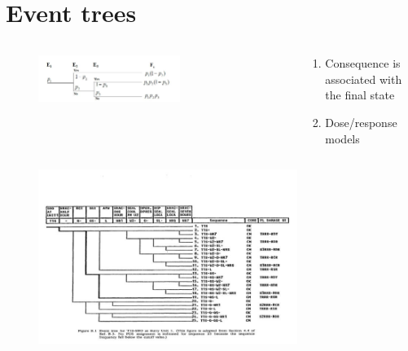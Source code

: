 \documentclass[aspectratio=1610,pdftex,dvipsnames,compress,xcolor={dvipsnames}]{beamer}
\begin{document}
\section{Event trees}


\addtocounter{framenumber}{-1}
\begin{frame}{}
    \begin{columns}[c]

        \begin{column}{0.65\textwidth}
            \begin{figure}
                \centering
                \includegraphics[width=0.65\textwidth]{event.tree.jpg}
            \end{figure}
        \end{column}

        \begin{column}{0.35\textwidth}
            \begin{enumerate}[series=outerlist,topsep=0pt,itemsep=21pt,leftmargin=*,label=(\arabic*)]
                \item[]Consequence is associated with the final state
                \item[]Dose/response models
            \end{enumerate}
        \end{column}

    \end{columns}
\end{frame}


\begin{frame}{}
    \begin{figure}
        \centering
        \includegraphics[width=0.75\textwidth]{event.tree.wash.jpg}
    \end{figure}
\end{frame}
\end{document}
